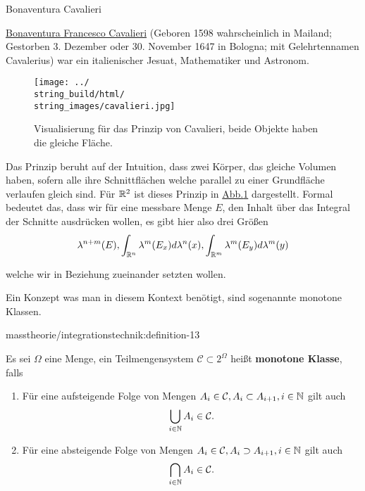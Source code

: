 \begin{emphBox}{Bonaventura Cavalieri}{}

\par
\href{https://de.wikipedia.org/wiki/Bonaventura\_Cavalieri}{Bonaventura Francesco Cavalieri} (Geboren 1598 wahrscheinlich in Mailand; Gestorben 3. Dezember oder 30. November 1647 in Bologna; mit Gelehrtennamen Cavalerius) war ein italienischer Jesuat, Mathematiker und Astronom.
\end{emphBox}

\begin{figure}[htbp]
\centering


\noindent\texttt{[image: ../\\string\_build/html/\\string\_images/cavalieri.jpg]}
\caption{Visualisierung für das Prinzip von Cavalieri, beide Objekte haben die gleiche Fläche.}\label{\detokenize{masstheorie/integrationstechnik:fig-cavalieri}}\end{figure}

\par
Das Prinzip beruht auf der Intuition, dass zwei Körper, das gleiche Volumen haben, sofern alle ihre Schnittflächen welche parallel zu einer Grundfläche verlaufen gleich sind. Für \(\mathbb{R}^2\) ist dieses Prinzip in \hyperref[\detokenize{masstheorie/integrationstechnik:fig-cavalieri}]{Abb.\@ \ref{\detokenize{masstheorie/integrationstechnik:fig-cavalieri}}} dargestellt. Formal bedeutet das, dass wir für eine messbare Menge \(E\), den Inhalt über das Integral der Schnitte ausdrücken wollen, es gibt hier also drei Größen
\begin{align*}
\lambda^{n+m}(E), \int_{\mathbb{R}^n} \lambda^m(E_x) d\lambda^n(x), \int_{\mathbb{R}^m} \lambda^m(E_y) d\lambda^m(y)
\end{align*}
\par
welche wir in Beziehung zueinander setzten wollen.

\par
Ein Konzept was man in diesem Kontext benötigt, sind sogenannte monotone Klassen.
\begin{definition}{}{masstheorie/integrationstechnik:definition-13}



\par
Es sei \(\Omega\) eine Menge, ein Teilmengensystem \(\mathcal{C}\subset 2^\Omega\) heißt \textbf{monotone Klasse}, falls
\begin{enumerate}

\item {} 
\par
Für eine aufsteigende Folge von Mengen \(A_i\in\mathcal{C}, A_i\subset A_{i+1}, i\in\mathbb{N}\) gilt auch
\begin{align*}
\bigcup_{i\in\mathbb{N}} A_i\in\mathcal{C}.
\end{align*}
\item {} 
\par
Für eine absteigende Folge von Mengen \(A_i\in\mathcal{C}, A_i\supset A_{i+1}, i\in\mathbb{N}\) gilt auch
\begin{align*}
\bigcap_{i\in\mathbb{N}} A_i\in\mathcal{C}.
\end{align*}
\end{enumerate}
\end{definition}

